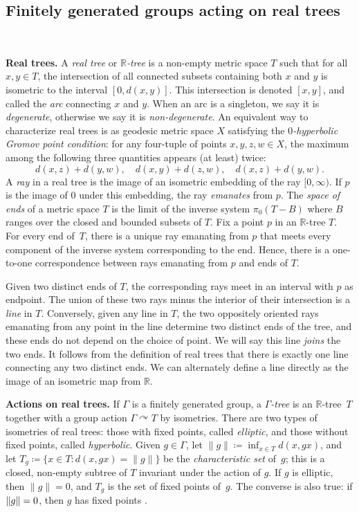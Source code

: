 \documentclass[11pt]{amsart}
\def\acts{\curvearrowright}
\numberwithin{equation}{section}
\numberwithin{figure}{section}
\theoremstyle{definition}
\theoremstyle{plain}
\newcommand\bbR{\ensuremath{\mathbb{R}}}
\DeclarePairedDelimiter\norm{\lVert}{\rVert}
\def\acts{\curvearrowright}
\begin{document}
\subsection{Finitely generated groups acting on real trees}
\ \relax

\textbf{Real trees.}
A \emph{real tree} or \emph{$\mathbb{R}$-tree} is a non-empty metric space $T$ such that for
all $x,y \in T$, the intersection of all connected subsets containing
both $x$ and $y$ is isometric to the interval $[0, d(x, y)]$.  This
intersection is denoted
$[x, y]$, and called the \emph{arc} connecting $x$ and $y$.
When an arc is a singleton, we say it is \emph{degenerate}, otherwise we say it is \emph{non-degenerate}.
An equivalent way to characterize real trees is as geodesic metric
space $X$ satisfying the \emph{$0$-hyperbolic Gromov point condition}:
for any four-tuple of points $x,y,z,w \in X$,
the maximum among the following three quantities appears (at least) twice:
\[
d(x,z) + d(y,w), \quad d(x,y) + d(z,w), \quad d(x,z) + d(y,w).
\]
A \emph{ray} in a real tree is the image of an isometric embedding of
the ray $[0,\infty)$. If $p$ is the image of $0$ under this embedding,
the ray \emph{emanates} from $p$. The \emph{space of ends} of a metric
space $T$ is the limit of the inverse system $\pi_0(T-B)$ where $B$
ranges over the closed and bounded subsets of $T$. Fix a point $p$ in
an $\bbR$-tree $T$. For every end of~$T$, there is a unique
ray
emanating from $p$ that meets every component of the inverse system
corresponding to the end.
Hence, there is a one-to-one correspondence between
rays emanating from $p$ and ends of $T$. 

Given two distinct
ends of $T$, the corresponding rays meet in an interval with $p$ as
endpoint. The union of these two rays minus the interior of their
intersection is a \emph{line} in $T$. Conversely, given any line in $T$, the
two oppositely oriented rays emanating from any point in the line
determine two distinct ends of the tree, and these ends do not depend
on the choice of point. We will say this line \emph{joins} the two
ends. It follows from the definition of real trees that there is exactly
one line connecting
any two distinct ends. We can alternately define a line directly as the image of an isometric map from $\bbR$.

\textbf{Actions on real trees.} If $\Gamma$ is a finitely generated
group, a
\emph{$\Gamma$-tree} is an $\mathbb{R}$-tree~$T$ together with a group
action $\Gamma \acts T$ by isometries.
There are two types of isometries of real trees: those with fixed
points, called \emph{elliptic}, and those without fixed points, called
\emph{hyperbolic}.
Given $g\in \Gamma$, let $\| g\|\coloneqq\inf_{x \in T} d(x,gx)$, and
let $T_g \coloneqq \{ x\in T : d(x,gx)=\| g\| \}$ be the
\emph{characteristic set} of~$g$; this is a closed, non-empty subtree
of $T$ invariant under the action of $g$.
If $g$ is elliptic, then $\| g \| =0$, and $T_g$ is the
set of fixed points of~$g$. The converse is also true: if $\norm{g} =
0$, then $g$ has fixed points \cite[Section~1.3]{CM87:GroupActions}.
\end{document}

